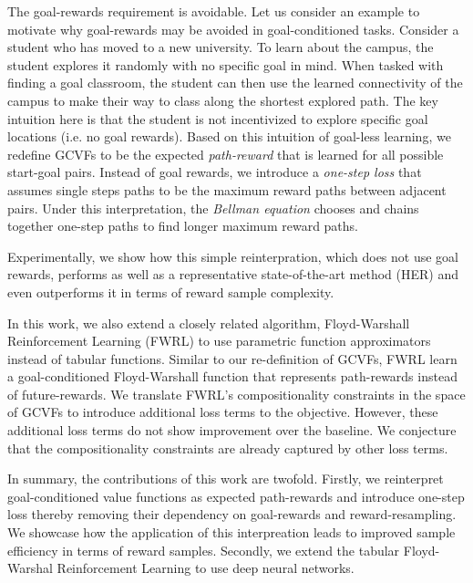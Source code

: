 The goal-rewards requirement is avoidable. Let us consider an example to
motivate why goal-rewards may be avoided in goal-conditioned tasks. Consider a
student who has moved to a new university. To learn about the campus,
the student explores it randomly with no specific goal in mind. When
tasked with finding a goal classroom, the student can then use the
learned connectivity of the campus to make their way to class along the
shortest explored path. The key intuition here is that the
student is not incentivized to explore specific goal locations (i.e. no
goal rewards). 
%
Based on this intuition of goal-less learning, we redefine GCVFs to be
the expected \emph{path-reward} that is learned for all possible
start-goal pairs. Instead of goal rewards, we  
introduce a \emph{one-step loss} that assumes single steps paths 
to be the maximum reward paths between adjacent pairs.
Under this interpretation, the \emph{Bellman equation} chooses and chains
together one-step paths to find longer maximum reward paths. 

%
Experimentally, we show how this simple reinterpration, which does not use goal
rewards, performs as well as a representative state-of-the-art method (HER) and
even outperforms it in terms of reward sample complexity.

In this work, we also extend a closely related algorithm, Floyd-Warshall Reinforcement
Learning (FWRL) \citep{dhiman2018floydwarshall} to use parametric
function approximators instead of tabular functions. Similar to our
re-definition of GCVFs, FWRL learn a goal-conditioned Floyd-Warshall function
that represents path-rewards instead of future-rewards.
We translate FWRL's compositionality constraints in the space of GCVFs to introduce
additional loss terms to the objective. However, these additional loss
terms do not show improvement over the baseline. We conjecture that the
compositionality constraints are already captured by other loss terms. 

In summary, the  contributions of this work are twofold. Firstly, we
reinterpret goal-conditioned value functions as expected path-rewards
and introduce one-step loss thereby removing their dependency on
goal-rewards and reward-resampling. We showcase how the
application of this interpreation leads to improved sample efficiency in  terms
of reward samples.
Secondly, we extend the tabular Floyd-Warshal Reinforcement Learning to
use deep neural networks.


